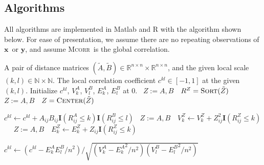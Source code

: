\documentclass[11pt]{article}
\providecommand{\sct}[1]{{\normalfont\textsc{#1}}}
\providecommand{\mb}[1]{\boldsymbol{#1}}
\newcommand{\Real}{\mathbb{R}}
\newcommand{\G}{c}
\newcommand{\Linefor}[2]{%
    \State \algorithmicfor\ {#1}\ \algorithmicdo\ {#2} \algorithmicend\ \algorithmicfor%
}
\newcommand{\Mgc}{\sct{Mgc}}
\newcommand{\Mcorr}{\sct{Mcorr}}
\newcommand{\mbx}{\ensuremath{\mb{x}}}
\newcommand{\mby}{\ensuremath{\mb{y}}}
\newcommand{\rto}{\leftarrow}
\begin{document}
\subsection{Algorithms}
\label{appen:algorithms}
All algorithms are implemented in Matlab and R with the algorithm shown below. For ease of presentation, we assume there are no repeating observations of \mbx~or \mby, and assume \Mcorr~is the global correlation.

\begin{algorithm}
\caption{Compute local test statistic for a given scale. This algorithm runs in $O(n^2)$ once the rank information is provided, which is suitable for \Mgc~computation if an optimal scale is already estimated. But it would take $O(n^4)$ if used to compute all local correlations. Note that for the default \Mgc~implementation by single centering, the centering function centers $\tilde{A}$ by column and $\tilde{B}$ by row, and the sorting function sorts $\tilde{A}$ within column and $\tilde{B}$ within row.}
\label{alg:1scale}
\begin{algorithmic}[1]
\Require A pair of distance matrices $(\tilde{A},\tilde{B}) \in \Real^{n \times n} \times \Real^{n \times n}$, and the given local scale $(k,l) \in \mathbb{N} \times \mathbb{N}$.
\Ensure The local correlation coefficient $\G^{kl} \in [-1,1]$ at the given $(k,l)$.
\State Initialize $\G^{kl}$, $V^{A}_{k}$, $V^{B}_{l}$, $E^{A}_{k}$, $E^{B}_{l}$ at $0$.
\Linefor{$Z:=A,B$}{$R^{Z}=\textsc{Sort}(\tilde{Z})$} 
\Linefor{$Z:=A,B$}{$Z=\textsc{Center}(\tilde{Z})$}  

\State $\G^{kl} \rto \G^{kl}+A_{ij}B_{ij}\mb{I}(R^{A}_{ij} \leq k)\mb{I}(R^{B}_{ij} \leq l)$ 
\Linefor{$Z:=A,B$}{$V^{Z}_{k} \rto V^{Z}_{k}+Z_{ij}^2\mb{I}(R^{Z}_{ij} \leq k)$} 
\Linefor{$Z:=A,B$}{$E^{Z}_{k} \rto E^{Z}_{k}+Z_{ij}\mb{I}(R^{Z}_{ij} \leq k)$} 
\EndFor

\State $\G^{kl} \rto \left(\G^{kl}-E^{A}_{k}E^{B}_{l}/n^2\right)/\sqrt{\left(V^{A}_{k}-{E^{A}_{k}}^2/n^2\right) \left(V^{B}_{l}-{E^{B}_{l}}^2/n^2\right)}$  

\EndFunction
\end{algorithmic}
\end{algorithm} 
\end{document}
